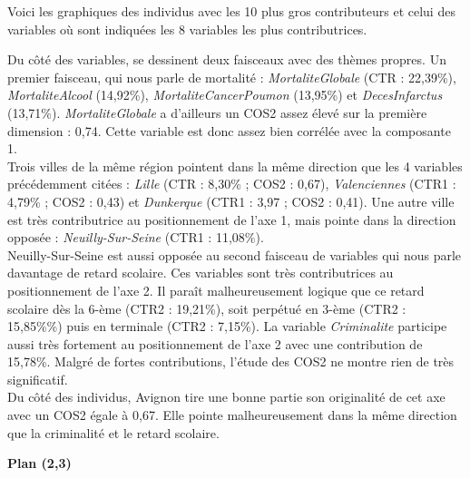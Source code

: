 \documentclass{article}
\begin{document}
Voici les graphiques des individus avec les 10 plus gros contributeurs et celui des variables où sont indiquées les 8 variables les plus contributrices.

Du côté des variables, se dessinent deux faisceaux avec des thèmes propres. Un premier faisceau, qui nous parle de mortalité : \emph{MortaliteGlobale} (CTR : 22,39\%), \emph{MortaliteAlcool} (14,92\%), \emph{MortaliteCancerPoumon} (13,95\%) et \emph{DecesInfarctus} (13,71\%). \emph{MortaliteGlobale} a d'ailleurs un COS2 assez élevé sur la première dimension : 0,74. Cette variable est donc assez bien corrélée avec la composante 1.\\

Trois villes de la même région pointent dans la même direction que les 4 variables précédemment citées : \emph{Lille} (CTR : 8,30\% ;  COS2 : 0,67), \emph{Valenciennes} (CTR1 : 4,79\% ; COS2 : 0,43) et \emph{Dunkerque} (CTR1 : 3,97 ; COS2 : 0,41). Une autre ville est très contributrice au positionnement de l'axe 1, mais pointe dans la direction opposée : \emph{Neuilly-Sur-Seine} (CTR1 : 11,08\%). \\

Neuilly-Sur-Seine est aussi opposée au second faisceau de variables qui nous parle davantage de retard scolaire. Ces variables sont très contributrices au positionnement de l'axe 2. Il paraît malheureusement logique que ce retard scolaire dès la 6-ème (CTR2 : 19,21\%), soit perpétué en 3-ème (CTR2 : 15,85\%\%) puis en terminale (CTR2 : 7,15\%). La variable \emph{Criminalite} participe aussi très fortement au positionnement de l'axe 2 avec une contribution de 15,78\%. Malgré de fortes contributions, l'étude des COS2 ne montre rien de très significatif. \\

Du côté des individus, Avignon tire une bonne partie son originalité de cet axe avec un COS2 égale à 0,67. Elle pointe malheureusement dans la même direction que la criminalité et le retard scolaire.

\bigskip

{\large \textbf{Plan (2,3)}}
\end{document}
